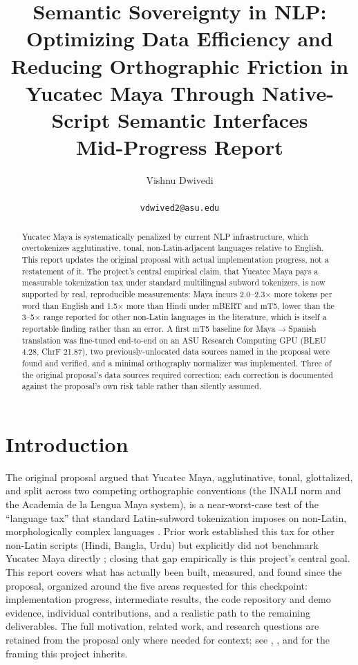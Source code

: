\documentclass[11pt]{article}
\title{Semantic Sovereignty in NLP: Optimizing Data Efficiency and Reducing
Orthographic Friction in Yucatec Maya Through Native-Script Semantic Interfaces \\
\large Mid-Progress Report}
\author{Vishnu Dwivedi \\
  \\
  \texttt{vdwived2@asu.edu}}
\begin{document}
\maketitle

\begin{abstract}
Yucatec Maya is systematically penalized by current NLP infrastructure, which
overtokenizes agglutinative, tonal, non-Latin-adjacent languages relative to
English. This report updates the original proposal with actual implementation
progress, not a restatement of it. The project's central empirical claim,
that Yucatec Maya pays a measurable tokenization tax under standard
multilingual subword tokenizers, is now supported by real, reproducible
measurements: Maya incurs 2.0--2.3$\times$ more tokens per word than English
and 1.5$\times$ more than Hindi under mBERT and mT5, lower than the 3--5$\times$
range reported for other non-Latin languages in the literature, which is itself
a reportable finding rather than an error. A first mT5 baseline for
Maya$\to$Spanish translation was fine-tuned end-to-end on an ASU Research
Computing GPU (BLEU 4.28, ChrF 21.87), two previously-unlocated data sources
named in the proposal were found and verified, and a minimal orthography
normalizer was implemented. Three of the original proposal's data sources
required correction; each correction is documented against the proposal's own
risk table rather than silently assumed.
\end{abstract}

\section{Introduction}
\label{sec:intro}

The original proposal argued that Yucatec Maya, agglutinative, tonal,
glottalized, and split across two competing orthographic conventions (the
INALI norm and the Academia de la Lengua Maya system), is a near-worst-case
test of the ``language tax'' that standard Latin-subword tokenization imposes
on non-Latin, morphologically complex languages \cite{haase2026,churchill2026}.
Prior work established this tax for other non-Latin scripts (Hindi, Bangla,
Urdu) but explicitly did not benchmark Yucatec Maya directly
\cite{churchill2026}; closing that gap empirically is this project's central
goal. This report covers what has actually been built, measured, and found
since the proposal, organized around the five areas requested for this
checkpoint: implementation progress, intermediate results, the code
repository and demo evidence, individual contributions, and a realistic
path to the remaining deliverables. The full motivation, related work, and
research questions are retained from the proposal only where needed for
context; see \citet{bird2022}, \citet{joshi2020}, and \citet{kornai2013} for
the framing this project inherits.
\end{document}
